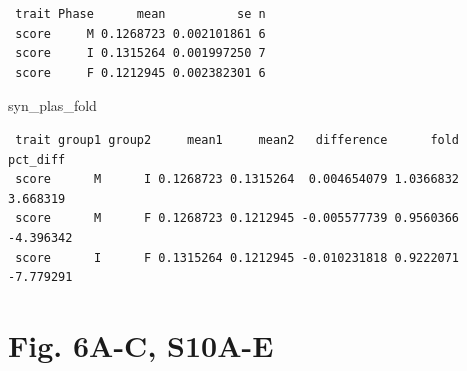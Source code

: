 \documentclass[
  landscape]{article}
\newenvironment{Shaded}{\begin{snugshade}}{\end{snugshade}}
\newcommand{\NormalTok}[1]{#1}
\begin{document}
\begin{verbatim}
 trait Phase      mean          se n
 score     M 0.1268723 0.002101861 6
 score     I 0.1315264 0.001997250 7
 score     F 0.1212945 0.002382301 6
\end{verbatim}

\begin{Shaded}
\begin{Highlighting}[]
\NormalTok{syn\_plas\_fold}
\end{Highlighting}
\end{Shaded}

\begin{verbatim}
 trait group1 group2     mean1     mean2   difference      fold  pct_diff
 score      M      I 0.1268723 0.1315264  0.004654079 1.0366832  3.668319
 score      M      F 0.1268723 0.1212945 -0.005577739 0.9560366 -4.396342
 score      I      F 0.1315264 0.1212945 -0.010231818 0.9222071 -7.779291
\end{verbatim}

\section{Fig. 6A-C, S10A-E}\label{fig.-6a-c-s10a-e}
\end{document}
